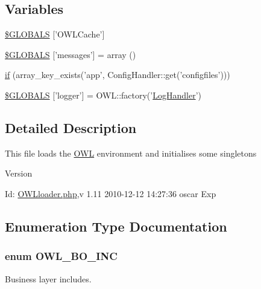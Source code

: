\subsection*{Variables}
\begin{DoxyCompactItemize}
\item 
\hyperlink{OWLloader_8php_a79190ec221c2b52403f7324f1d224c8f}{\$GLOBALS} \mbox{[}'OWLCache'\mbox{]}
\item 
\hyperlink{OWLloader_8php_a65f2996116eed36e9ab25f254a470259}{\$GLOBALS} \mbox{[}'messages'\mbox{]} = array ()
\item 
\hyperlink{OWLloader_8php_a78407183564d6b92f2219d8a10b9349c}{if} (array\_\-key\_\-exists('app', ConfigHandler::get('configfiles')))
\item 
\hyperlink{OWLloader_8php_ad8f7743ae327face727dae55887c2a43}{\$GLOBALS} \mbox{[}'logger'\mbox{]} = OWL::factory('\hyperlink{classLogHandler}{LogHandler}')
\end{DoxyCompactItemize}


\subsection{Detailed Description}
This file loads the \hyperlink{classOWL}{OWL} environment and initialises some singletons \begin{DoxyVersion}{Version}

\end{DoxyVersion}
\begin{DoxyParagraph}{Id:}
\hyperlink{OWLloader_8php}{OWLloader.php},v 1.11 2010-\/12-\/12 14:27:36 oscar Exp 
\end{DoxyParagraph}


\subsection{Enumeration Type Documentation}
\subsubsection[{OWL\_\-BO\_\-INC}]{\setlength{\rightskip}{0pt plus 5cm}enum {\bf OWL\_\-BO\_\-INC}}\label{OWLloader_8php_aca50646bc73c3addf0e0f25081eae0ae}


Business layer includes. 

